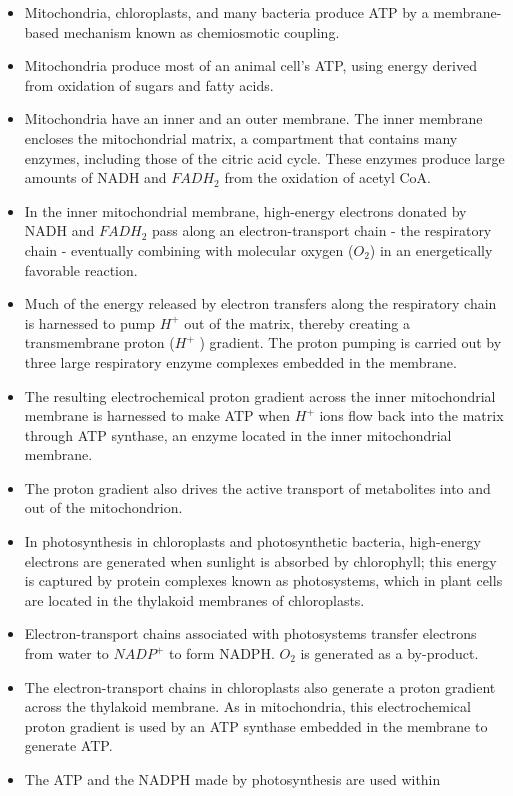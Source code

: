 \begin{itemize}
\item Mitochondria, chloroplasts, and many bacteria produce ATP by a
membrane-based mechanism known as chemiosmotic coupling.
\item Mitochondria produce most of an animal cell’s ATP, using energy
derived from oxidation of sugars and fatty acids.
\item Mitochondria have an inner and an outer membrane. The inner
membrane encloses the mitochondrial matrix, a compartment that
contains many enzymes, including those of the citric acid cycle.
These enzymes produce large amounts of NADH and $FADH_2$ from the
oxidation of acetyl CoA.
\item In the inner mitochondrial membrane, high-energy electrons donated
by NADH and $FADH_2$ pass along an electron-transport chain - the respiratory
chain - eventually combining with molecular oxygen ($O_2$) in
an energetically favorable reaction.
\item Much of the energy released by electron transfers along the respiratory
chain is harnessed to pump $H^+$ out of the matrix, thereby creating
a transmembrane proton ($H^+$ ) gradient. The proton pumping is carried
out by three large respiratory enzyme complexes embedded in
the membrane.
\item The resulting electrochemical proton gradient across the inner mitochondrial
membrane is harnessed to make ATP when $H^+$ ions flow
back into the matrix through ATP synthase, an enzyme located in the
inner mitochondrial membrane.
\item The proton gradient also drives the active transport of metabolites
into and out of the mitochondrion.
\item In photosynthesis in chloroplasts and photosynthetic bacteria,
high-energy electrons are generated when sunlight is absorbed by
chlorophyll; this energy is captured by protein complexes known as
photosystems, which in plant cells are located in the thylakoid membranes
of chloroplasts.
\item Electron-transport chains associated with photosystems transfer
electrons from water to $NADP^+$ to form NADPH. $O_2$ is generated as a
by-product.
\item The electron-transport chains in chloroplasts also generate a proton
gradient across the thylakoid membrane. As in mitochondria, this
electrochemical proton gradient is used by an ATP synthase embedded
in the membrane to generate ATP.
\item The ATP and the NADPH made by photosynthesis are used within

\end{itemize}
